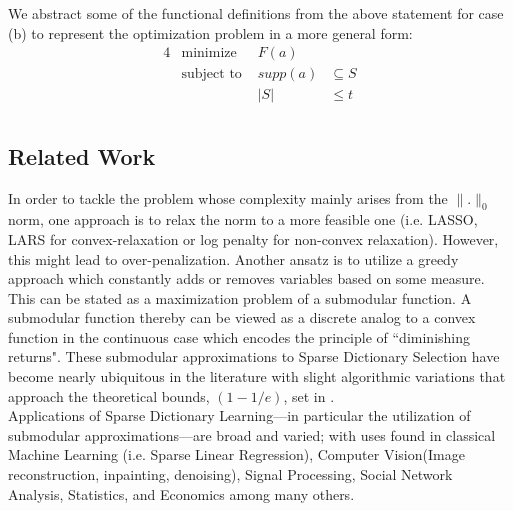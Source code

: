 \documentclass{article}
\newcommand{\R}{\mathbb{R}}
\DeclareMathOperator*{\argmin}{\arg\!\min}
\begin{document}

\noindent We abstract some of the functional definitions from the above statement for case (b) to represent the optimization problem in a more general form:
\begin{alignat*}{4}
    &\text{minimize }   & F(a) & \\
    &\text{subject to } & \textit{supp}(a)&\subseteq S\\
    &                   & |S|  &\leq t\\
\end{alignat*}

\subsection{Related Work}
In order to tackle the problem whose complexity mainly arises from the $\| .\|_0$ norm, one approach is to relax the norm to a more feasible one (i.e. LASSO, LARS for convex-relaxation or log penalty for non-convex relaxation). However, this might lead to over-penalization\cite{nonconvexrelax}. Another ansatz is to utilize a greedy approach which constantly adds or removes variables based on some measure\cite{submod_spectral}.  This can be stated as a maximization problem of a submodular function. A submodular function thereby can be viewed as a discrete analog to a convex function in the continuous case\cite{submod_sparsecoding} which encodes the principle of ``diminishing returns". These submodular approximations to Sparse Dictionary Selection have become nearly ubiquitous in the literature with slight algorithmic variations that approach the theoretical bounds, $(1 - 1/e)$, set in \cite{Krause05near-optimalnonmyopic}.
\\

\noindent Applications of Sparse Dictionary Learning---in particular the utilization of submodular approximations---are broad and varied; with uses found in classical Machine Learning (i.e. Sparse Linear Regression), Computer Vision(Image reconstruction, inpainting, denoising), Signal Processing\cite{nonconvexrelax}\cite{submod_sparsecoding}, Social Network Analysis, Statistics\cite{rIBP}, and Economics\cite{utilityWelfare} among many others. 
\\
\end{document}
